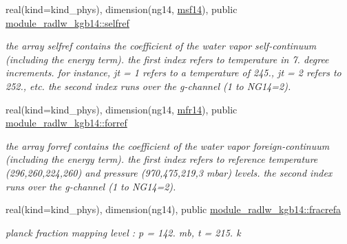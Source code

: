 \begin{DoxyCompactItemize}
\mbox{\label{group__module__radlw__kgbnn_ga0e390a41b1c9e2ece765d65774060bca}} 
real(kind=kind\+\_\+phys), dimension(ng14, \hyperlink{group__module__radlw__kgbnn_ga37c15d52e45cd6b36dc246a059b0c5ca}{msf14}), public \hyperlink{group__module__radlw__kgbnn_ga0e390a41b1c9e2ece765d65774060bca}{module\+\_\+radlw\+\_\+kgb14\+::selfref}
\begin{DoxyCompactList}\small\item\em the array selfref contains the coefficient of the water vapor self-\/continuum (including the energy term). the first index refers to temperature in 7. degree increments. for instance, jt = 1 refers to a temperature of 245., jt = 2 refers to 252., etc. the second index runs over the g-\/channel (1 to N\+G14=2). \end{DoxyCompactList}\item 
\mbox{\label{group__module__radlw__kgbnn_ga8478067cb8a07a02b56c09fa3c73eb67}} 
real(kind=kind\+\_\+phys), dimension(ng14, \hyperlink{group__module__radlw__kgbnn_ga52354badbce95c005b19bd5a443fd488}{mfr14}), public \hyperlink{group__module__radlw__kgbnn_ga8478067cb8a07a02b56c09fa3c73eb67}{module\+\_\+radlw\+\_\+kgb14\+::forref}
\begin{DoxyCompactList}\small\item\em the array forref contains the coefficient of the water vapor foreign-\/continuum (including the energy term). the first index refers to reference temperature (296,260,224,260) and pressure (970,475,219,3 mbar) levels. the second index runs over the g-\/channel (1 to N\+G14=2). \end{DoxyCompactList}\item 
\mbox{\label{group__module__radlw__kgbnn_gae1e7065b9ea30b36a3665ad594545e9b}} 
real(kind=kind\+\_\+phys), dimension(ng14), public \hyperlink{group__module__radlw__kgbnn_gae1e7065b9ea30b36a3665ad594545e9b}{module\+\_\+radlw\+\_\+kgb14\+::fracrefa}
\begin{DoxyCompactList}\small\item\em planck fraction mapping level \+: p = 142. mb, t = 215. k \end{DoxyCompactList}\item 
\mbox{\label{group__module__radlw__kgbnn_ga13a211bf8a903d0720fa72ac90e4fc3f}} 

\end{DoxyCompactItemize}
